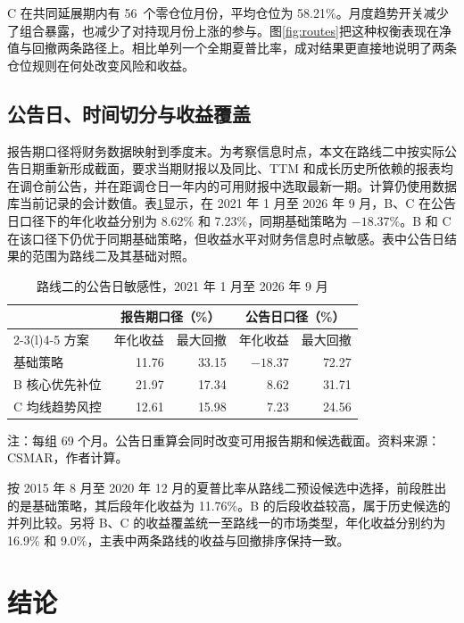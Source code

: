 C 在共同延展期内有 56\ 个零仓位月份，平均仓位为 58.21\%。月度趋势开关减少了组合暴露，也减少了对持现月份上涨的参与。图\ref{fig:routes}把这种权衡表现在净值与回撤两条路径上。相比单列一个全期夏普比率，成对结果更直接地说明了两条仓位规则在何处改变风险和收益。

\subsection{公告日、时间切分与收益覆盖}

报告期口径将财务数据映射到季度末。为考察信息时点，本文在路线二中按实际公告日期重新形成截面，要求当期财报以及同比、TTM 和成长历史所依赖的报表均在调仓前公告，并在距调仓日一年内的可用财报中选取最新一期。计算仍使用数据库当前记录的会计数值。表\ref{tab:ann}显示，在 2021 年 1 月至 2026 年 9 月，B、C 在公告日口径下的年化收益分别为 8.62\% 和 7.23\%，同期基础策略为 $-18.37\%$。B 和 C 在该口径下仍优于同期基础策略，但收益水平对财务信息时点敏感。表中公告日结果的范围为路线二及其基础对照。

\begin{table}[htbp]
\centering
\caption{路线二的公告日敏感性，2021 年 1 月至 2026 年 9 月}
\label{tab:ann}
\small
\renewcommand{\arraystretch}{1.2}
\begin{tabular}{@{}lrrrr@{}}
\toprule
& \multicolumn{2}{c}{报告期口径（\%）} & \multicolumn{2}{c}{公告日口径（\%）} \\
\cmidrule(lr){2-3}\cmidrule(l){4-5}
方案 & 年化收益 & 最大回撤 & 年化收益 & 最大回撤 \\
\midrule
基础策略 & 11.76 & 33.15 & $-18.37$ & 72.27 \\
B 核心优先补位 & 21.97 & 17.34 & 8.62 & 31.71 \\
C 均线趋势风控 & 12.61 & 15.98 & 7.23 & 24.56 \\
\bottomrule
\end{tabular}

\medskip
\begin{minipage}{0.95\linewidth}\footnotesize
注：每组 69 个月。公告日重算会同时改变可用报告期和候选截面。资料来源：CSMAR，作者计算。
\end{minipage}
\end{table}

按 2015 年 8 月至 2020 年 12 月的夏普比率从路线二预设候选中选择，前段胜出的是基础策略，其后段年化收益为 11.76\%。B 的后段收益较高，属于历史候选的并列比较。另将 B、C 的收益覆盖统一至路线一的市场类型，年化收益分别约为 16.9\% 和 9.0\%，主表中两条路线的收益与回撤排序保持一致。

\section{结论}

